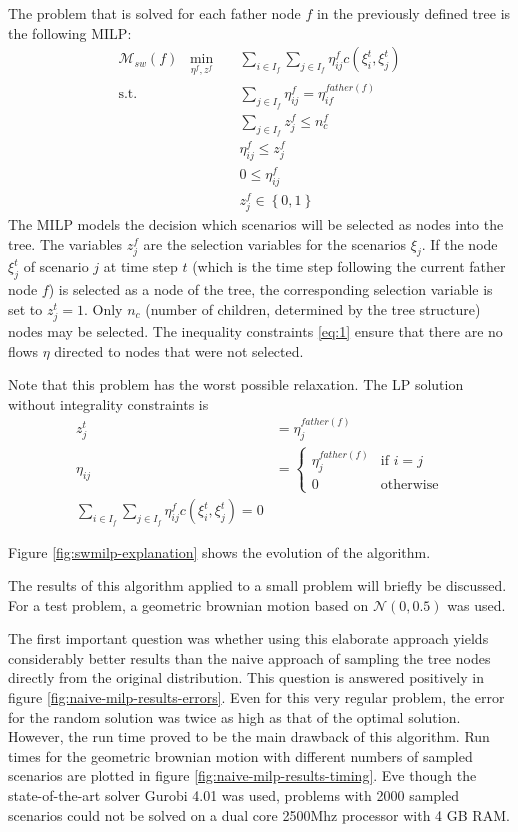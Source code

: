The problem that is solved for each father node $f$ in the previously defined tree is the following MILP:
\begin{eqnarray} %
  \label{eq:small-milp-in-alg}
  \mathcal{M}_{sw}(f)\; \; \min_{\eta^f,z^f}&&\sum_{i\in I_f}\sum_{j\in I_f}\eta_{ij}^fc(\xi_i^t,\xi_j^t)\\
  \mathrm{s.t.}&&\sum_{j\in I_f}\eta_{ij}^f = \eta_{if}^{father(f)}\\
  &&\sum_{j\in I_f}z_j^f \leq n_c^f\\
  \label{eq:1}
  &&\eta_{ij}^f\leq z_j^f\\
  &&0\leq \eta_{ij}^f\\
  &&z_j^f\in\left\{0,1\right\}
\end{eqnarray}
The MILP models the decision which scenarios will be selected as nodes into the tree.
The variables $z_j^f$ are the selection variables for the scenarios $\xi_j$.
If the node $\xi_j^t$ of scenario $j$ at time step $t$ (which is the time step following the current father node $f$) is selected as a node of the tree, the corresponding selection variable is set to $z_j^t=1$.
Only $n_c$ (number of children, determined by the tree structure) nodes may be selected.
The inequality constraints \eqref{eq:1} ensure that there are no flows $\eta$ directed to nodes that were not selected.

Note that this problem has the worst possible relaxation. The LP solution without integrality constraints is
\begin{align}
  \label{eq:2}
  z_j^t &= \eta_j^{father(f)}\\
  \eta_{ij} &= \left\{
    \begin{array}{ll}
      \eta_j^{father(f)}&\text{if } i=j\\
      0&\text{otherwise}
    \end{array}
  \right.\\
  \sum_{i\in I_f}\sum_{j\in I_f}\eta_{ij}^fc(\xi_i^t,\xi_j^t) = 0
\end{align}

Figure \ref{fig:swmilp-explanation} shows the evolution of the algorithm.

The results of this algorithm applied to a small problem will briefly be discussed.
For a test problem, a geometric brownian motion based on $\mathcal{N}(0,0.5)$ was used.

The first important question was whether using this elaborate approach yields considerably better results than the naive approach of sampling the tree nodes directly from the original distribution.
This question is answered positively in figure \ref{fig:naive-milp-results-errors}.
Even for this very regular problem, the error for the random solution was twice as high as that of the optimal solution.
However, the run time proved to be the main drawback of this algorithm.
Run times for the geometric brownian motion with different numbers of sampled scenarios are plotted in figure \ref{fig:naive-milp-results-timing}.
Eve though the state-of-the-art solver Gurobi 4.01 was used, problems with 2000 sampled scenarios could not be solved on a dual core 2500Mhz processor with 4 GB RAM.

